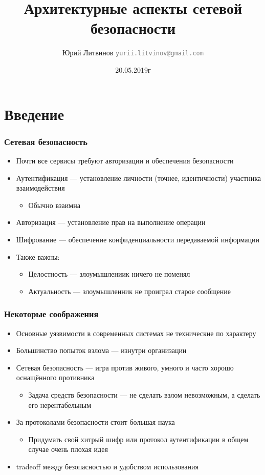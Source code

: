 \documentclass[xetex,mathserif,serif]{beamer}
\title{Архитектурные аспекты сетевой безопасности}
\author[Юрий Литвинов]{Юрий Литвинов \newline \textcolor{gray}{\small\texttt{yurii.litvinov@gmail.com}}}
\date{20.05.2019г}
\begin{document}
	\frame{\titlepage}

	\section{Введение}

	\begin{frame}
		\frametitle{Сетевая безопасность}
		\begin{itemize}
			\item Почти все сервисы требуют авторизации и обеспечения безопасности
			\item Аутентификация --- установление личности (точнее, идентичности) участника взаимодействия
			\begin{itemize}
				\item Обычно взаимна
			\end{itemize}
			\item Авторизация --- установление прав на выполнение операции
			\item Шифрование --- обеспечение конфиденциальности передаваемой информации
			\item Также важны:
			\begin{itemize}
				\item Целостность --- злоумышлениик ничего не поменял
				\item Актуальность --- злоумышленник не проиграл старое сообщение
			\end{itemize} 
		\end{itemize}
	\end{frame}

	\begin{frame}
		\frametitle{Некоторые соображения}
		\begin{itemize}
			\item Основные уязвимости в современных системах не технические по характеру
			\item Большинство попыток взлома --- изнутри организации
			\item Сетевая безопасность --- игра против живого, умного и часто хорошо оснащённого противника
			\begin{itemize}
				\item Задача средств безопасности --- не сделать взлом невозможным, а сделать его нерентабельным
			\end{itemize}
			\item За протоколами безопасности стоит большая наука
			\begin{itemize}
				\item Придумать свой хитрый шифр или протокол аутентификации в общем случае очень плохая идея
			\end{itemize} 
			\item tradeoff между безопасностью и удобством использования
		\end{itemize}
	\end{frame}
\end{document}
